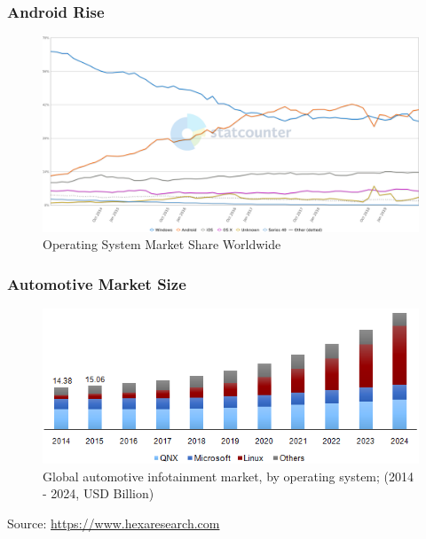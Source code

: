 \begin{frame}
  \frametitle{Android Rise}
  \vspace*{-2mm} %
    \begin{figure}
      \centering
      \includegraphics[scale=0.35]{images/os-stat.png}
      \vspace*{-2mm} %
      \caption{Operating System Market Share Worldwide}
    \end{figure}
  \vspace*{-12mm} %
\end{frame}

\begin{frame}
  \frametitle{Automotive Market Size}
    \begin{figure}
      \centering
      \includegraphics[scale=0.6]{images/automotive-market.png}
      \caption{Global automotive infotainment market, by operating system;
               \newline (2014 - 2024, USD Billion)}
    \end{figure}
    Source: \href{https://www.hexaresearch.com}{https://www.hexaresearch.com}
\end{frame}

